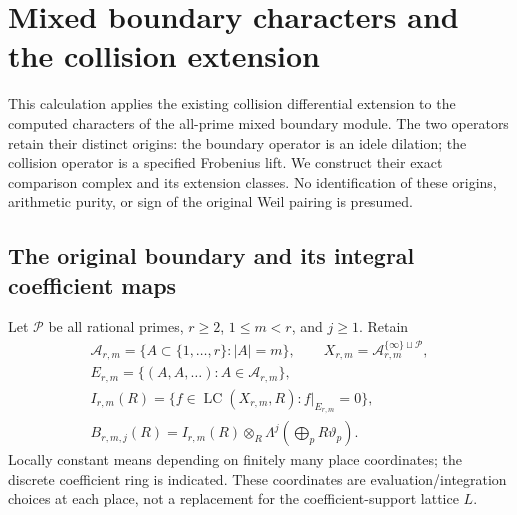 \section{Mixed boundary characters and the collision extension}
\label{sec:mixed-boundary-collision-extension}

This calculation applies the existing collision differential extension
to the computed characters of the all-prime mixed boundary module.
The two operators retain their distinct origins: the boundary operator
is an idele dilation; the collision operator is a specified Frobenius
lift. We construct their exact comparison complex and its extension
classes. No identification of these origins, arithmetic purity, or
sign of the original Weil pairing is presumed.

\subsection{The original boundary and its integral coefficient maps}

Let \(\mathcal P\) be all rational primes, \(r\ge2\), \(1\le m<r\),
and \(j\ge1\). Retain
\begin{equation}\tag{BCE1}
\begin{gathered}
\mathcal A_{r,m}=\{A\subset\{1,\ldots,r\}:|A|=m\},\qquad
X_{r,m}=\mathcal A_{r,m}^{\{\infty\}\sqcup\mathcal P},\\
E_{r,m}=\{(A,A,\ldots):A\in\mathcal A_{r,m}\},\\
I_{r,m}(R)=\{f\in\operatorname{LC}(X_{r,m},R):
                              f|_{E_{r,m}}=0\},\\
B_{r,m,j}(R)=I_{r,m}(R)\otimes_R
                   \Lambda^j\left(\bigoplus_pR\vartheta_p\right).
\end{gathered}
\end{equation}
Locally constant means depending on finitely many place coordinates;
the discrete coefficient ring is indicated. These coordinates are
evaluation/integration choices at each place, not a replacement for
the coefficient-support lattice \(L\).

